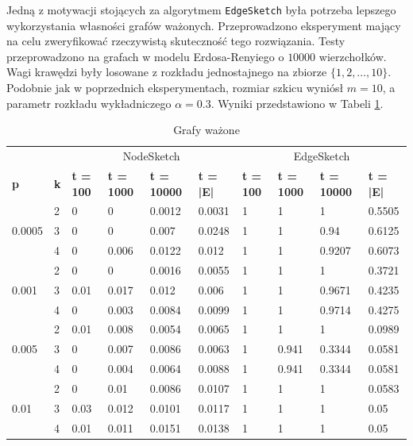     Jedną z motywacji stojących za algorytmem \texttt{EdgeSketch} była potrzeba lepszego wykorzystania własności grafów ważonych.  Przeprowadzono eksperyment mający na celu zweryfikować rzeczywistą skuteczność tego rozwiązania. Testy przeprowadzono na grafach w modelu Erdosa-Renyiego o $10000$ wierzchołków. Wagi krawędzi były losowane z rozkładu jednostajnego na zbiorze $\{1, 2, \ldots, 10\}$. Podobnie jak w poprzednich eksperymentach, rozmiar szkicu wyniósł $m = 10$, a parametr rozkładu wykładniczego $\alpha = 0.3$. Wyniki przedstawiono w Tabeli \ref{tab:weighted_graphs}.


    \begin{table}[!ht]
        \small
        \centering
        \begin{tabular}{|l|l|l|l|l|l|l|l|l|l|}
        \hline
        & & \multicolumn{4}{c|}{NodeSketch} & \multicolumn{4}{c|}{EdgeSketch} \\ \cline{1-10}
                \textbf{p} & \textbf{k} & \textbf{t = 100} & \textbf{t = 1000} & \textbf{t = 10000} & \textbf{t = |E|} & \textbf{t = 100} & \textbf{t = 1000} & \textbf{t = 10000} & \textbf{t = |E|} \\ \hline\hline
            \multirow{3}{*}{0.0005} & 2 & 0 & 0 & 0.0012 & 0.0031 & 1 & 1 & 1 & 0.5505 \\ \cline{2-10}
            & 3 & 0 & 0 & 0.007 & 0.0248 & 1 & 1 & 0.94 & 0.6125 \\ \cline{2-10}
            & 4 & 0 & 0.006 & 0.0122 & 0.012 & 1 & 1 & 0.9207 & 0.6073 \\ \hline\hline
            \multirow{3}{*}{0.001} & 2 & 0 & 0 & 0.0016 & 0.0055 & 1 & 1 & 1 & 0.3721 \\ \cline{2-10}
            & 3 & 0.01 & 0.017 & 0.012 & 0.006 & 1 & 1 & 0.9671 & 0.4235 \\ \cline{2-10}
            & 4 & 0 & 0.003 & 0.0084 & 0.0099 & 1 & 1 & 0.9714 & 0.4275 \\ \hline\hline
            \multirow{3}{*}{0.005} & 2 & 0.01 & 0.008 & 0.0054 & 0.0065 & 1 & 1 & 1 & 0.0989 \\ \cline{2-10}
            & 3 & 0 & 0.007 & 0.0086 & 0.0063 & 1 & 0.941 & 0.3344 & 0.0581 \\ \cline{2-10}
            & 4 & 0 & 0.004 & 0.0064 & 0.0088 & 1 & 0.941 & 0.3344 & 0.0581 \\ \hline\hline
            \multirow{3}{*}{0.01} & 2 & 0 & 0.01 & 0.0086 & 0.0107 & 1 & 1 & 1 & 0.0583 \\ \cline{2-10}
            & 3 & 0.03 & 0.012 & 0.0101 & 0.0117 & 1 & 1 & 1 & 0.05 \\ \cline{2-10}
            & 4 & 0.01 & 0.011 & 0.0151 & 0.0138 & 1 & 1 & 1 & 0.05 \\ \hline
        \end{tabular}
        \caption{Grafy ważone}
        \label{tab:weighted_graphs}
    \end{table}


